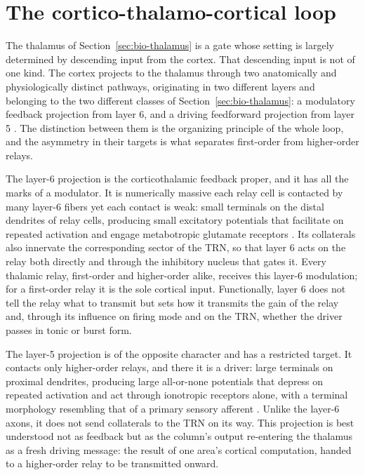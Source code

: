 \section{The cortico-thalamo-cortical loop}
\label{sec:bio-loop}

The thalamus of Section~\ref{sec:bio-thalamus} is a gate whose setting is largely determined by descending input from the cortex. That descending input is not of one kind. The cortex projects to the thalamus through two anatomically and physiologically distinct pathways, originating in two different layers and belonging to the two different classes of Section~\ref{sec:bio-thalamus}: a modulatory feedback projection from layer 6, and a driving feedforward projection from layer 5 \parencite{sherman1998, sherman2013}. The distinction between them is the organizing principle of the whole loop, and the asymmetry in their targets is what separates first-order from higher-order relays.

The layer-6 projection is the corticothalamic feedback proper, and it has all the marks of a modulator. It is numerically massive  each relay cell is contacted by many layer-6 fibers  yet each contact is weak: small terminals on the distal dendrites of relay cells, producing small excitatory potentials that facilitate on repeated activation and engage metabotropic glutamate receptors \parencite{sherman2013, shepherd2018}. Its collaterals also innervate the corresponding sector of the TRN, so that layer 6 acts on the relay both directly and through the inhibitory nucleus that gates it. Every thalamic relay, first-order and higher-order alike, receives this layer-6 modulation; for a first-order relay it is the sole cortical input. Functionally, layer 6 does not tell the relay what to transmit but sets how it transmits  the gain of the relay and, through its influence on firing mode and on the TRN, whether the driver passes in tonic or burst form.

The layer-5 projection is of the opposite character and has a restricted target. It contacts only higher-order relays, and there it is a driver: large terminals on proximal dendrites, producing large all-or-none potentials that depress on repeated activation and act through ionotropic receptors alone, with a terminal morphology resembling that of a primary sensory afferent \parencite{sherman2013}. Unlike the layer-6 axons, it does not send collaterals to the TRN on its way. This projection is best understood not as feedback but as the column's output re-entering the thalamus as a fresh driving message: the result of one area's cortical computation, handed to a higher-order relay to be transmitted onward.

